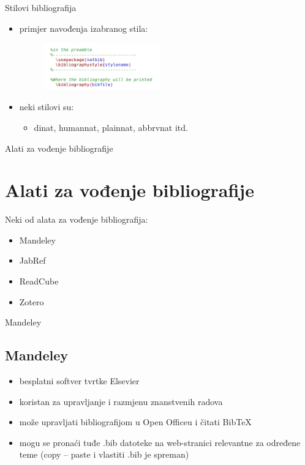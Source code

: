 \documentclass{beamer}
\begin{document}
\begin{frame}{Stilovi bibliografija}
\begin{itemize}
	\item primjer navođenja izabranog stila: \\
	\begin{figure}
	\includegraphics[width=5cm]{natbibprimjer3.png}
	\end{figure}
	\item neki stilovi su:
	\begin{itemize}
			\item dinat, humannat, plainnat, abbrvnat itd.  \\
	\end{itemize}
\end{itemize}
\end{frame}


\begin{frame}{Alati za vođenje bibliografije}
\section{Alati za vođenje bibliografije}
Neki od alata za vođenje bibliografija:
 \begin{itemize}
	\item Mandeley \\
	\item JabRef \\
	\item ReadCube \\
	\item Zotero \\
\end{itemize}
 \end{frame}

 

\begin{frame}{Mandeley}
\subsection{Mandeley}
\begin{itemize}
	\item besplatni softver tvrtke Elsevier \\
	\item koristan za upravljanje i razmjenu znanstvenih radova \\
	\item može upravljati bibliografijom u Open Officeu i čitati BibTeX \\
	\item mogu se pronaći  tuđe .bib datoteke na web-stranici relevantne za  
	određene teme (copy – paste i vlastiti .bib je spreman) \\
\end{itemize}
 \end{frame}
\end{document}
